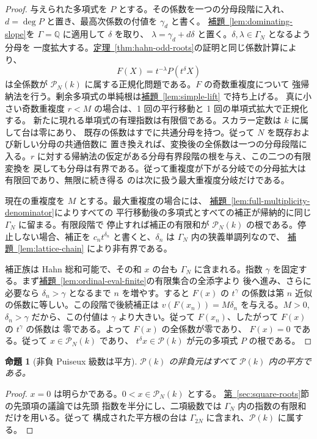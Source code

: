\documentclass[11pt,uplatex,dvipdfmx]{jsarticle}
\newcommand{\Puiseux}{\mathcal P(k)}
\newcommand{\Val}{v}
\newcommand{\namedref}[2]{\hyperref[#2]{#1~\ref*{#2}}}
\theoremstyle{proofnote}
\newtheorem{proposition}[theorem]{命題}
\begin{document}
\begin{proof}
  与えられた多項式を \(P\) とする。その係数を一つの分母段階に入れ、
  \(d=\deg P\) と置き、最高次係数の付値を \(\gamma_d\) と書く。
  \namedref{補題}{lem:dominating-slope}を \(\Gamma=\mathbb Q\) に適用して \(\delta\) を取り、
  \(\lambda=\gamma_d+d\delta\) と置く。\(\delta,\lambda\in\Gamma_N\) となるよう分母を
  一度拡大する。\namedref{定理}{thm:hahn-odd-roots}の証明と同じ係数計算により、
  \[
    F(X)=t^{-\lambda}P(t^\delta X)
  \]
  は全係数が \(\mathcal P_N(k)\) に属する正規化問題である。\(F\) の奇数重複度について
  強帰納法を行う。剰余多項式の単純根は\namedref{補題}{lem:simple-lift} で持ち上げる。
  真に小さい奇数重複度 \(r<M\) の場合は、1 回の平行移動と 1 回の単項式拡大で正規化する。
  新たに現れる単項式の有理指数は有限個である。スカラー定数は \(k\) に属して台は零にあり、
  既存の係数はすでに共通分母を持つ。従って \(N\) を既存および新しい分母の共通倍数に
  置き換えれば、変換後の全係数は一つの分母段階に入る。\(r\) に対する帰納法の仮定がある分母有界段階の根を与え、この二つの有限変換を
  戻しても分母は有界である。従って重複度が下がる分岐での分母拡大は有限回であり、無限に続き得る
  のは次に扱う最大重複度分岐だけである。

  現在の重複度を \(M\) とする。最大重複度の場合には、
  \namedref{補題}{lem:full-multiplicity-denominator}によりすべての
  平行移動後の多項式とすべての補正が帰納的に同じ \(\Gamma_N\) に留まる。有限段階で
  停止すれば補正の有限和が \(\mathcal P_N(k)\) の根である。停止しない場合、補正を
  \(c_nt^{\delta_n}\) と書くと、\(\delta_n\) は \(\Gamma_N\) 内の狭義単調列なので、
  \namedref{補題}{lem:lattice-chain} により非有界である。

  補正族は Hahn 総和可能で、その和 \(x\) の台も \(\Gamma_N\) に含まれる。指数
  \(\gamma\) を固定する。まず\namedref{補題}{lem:ordinal-eval-finite}の有限集合の全添字より
  後へ進み、さらに必要なら \(\delta_n>\gamma\) となるまで \(n\) を増やす。すると
  \(F(x)\) の \(t^\gamma\) の係数は第 \(n\) 近似の係数に等しい。この段階で後続補正は
  \(\Val(F(x_n))=M\delta_n\) を与える。\(M>0\), \(\delta_n>\gamma\) だから、この付値は
  \(\gamma\) より大きい。従って \(F(x_n)\)、したがって \(F(x)\) の \(t^\gamma\) の係数は
  零である。よって \(F(x)\) の全係数が零であり、
  \(F(x)=0\) である。従って \(x\in\mathcal P_N(k)\) であり、
  \(t^\delta x\in\Puiseux\) が元の多項式 \(P\) の根である。
\end{proof}

\begin{proposition}[非負 Puiseux 級数は平方]
\label{prop:puiseux-squares}
  \(\Puiseux\) の非負元はすべて \(\Puiseux\) 内の平方である。
\end{proposition}
\begin{proof}
  \(x=0\) は明らかである。\(0<x\in\mathcal P_N(k)\) とする。
  \namedref{第}{sec:square-roots}節の先頭項の議論では先頭
  指数を半分にし、二項級数では \(\Gamma_N\) 内の指数の有限和だけを用いる。従って
  構成された平方根の台は \(\Gamma_{2N}\) に含まれ、\(\Puiseux\) に属する。
\end{proof}
\end{document}
